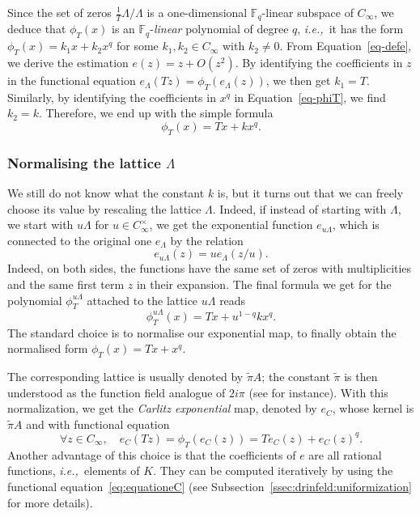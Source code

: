 \documentclass[11pt]{article}
\theoremstyle{definition}
\renewcommand{\tilde}{\widetilde}
\newcommand\Fq{\mathbb{F}_q}
\newcommand{\Cinf}{C_{\infty}}
\newcommand{\ie}{\textit{i.e.,~}}
\begin{document}
Since the set of zeros $\frac{1}{T} \Lambda / \Lambda$ is a 
one-dimensional $\Fq$-linear subspace of $\Cinf$, we deduce that
$\phi_T(x)$ is an $\Fq$-\emph{linear} polynomial of degree $q$, 
\ie it has the form $\phi_T(x) = k_1 x + k_2 x^q$
for some $k_1, k_2 \in \Cinf$ with $k_2\neq 0$. 
From Equation~\eqref{eq-defe}, we derive the estimation $e(z) 
= z + O(z^2)$. By identifying the coefficients in $z$ in the functional 
equation $e_\Lambda(Tz) = \phi_T(e_\Lambda(z))$, we then get $k_1 = T$.
Similarly, by identifying the coefficients in $x^q$ in Equation~\eqref{eq-phiT},
we find $k_2 = k$. Therefore, we end up with the simple formula
\[\phi_T(x)=T x + k x^q.\]

\subsubsection{Normalising the lattice \texorpdfstring{$\Lambda$}{Lambda}}

We still do not know what the constant $k$ is, but it turns out that we can freely choose its value by rescaling the lattice $\Lambda$. Indeed, if instead of starting with $\Lambda$, we start with $u\Lambda$ for $u\in\Cinf^\times$, we get the exponential function $e_{u\Lambda}$, which is connected to the original one
$e_{\Lambda}$ by the relation \[e_{u\Lambda}(z) = u e_\Lambda (z/u).\] 
Indeed, on both sides, the functions have the same set of zeros with multiplicities
and the same first term $z$ in their expansion. The final formula we get for the polynomial
$\phi_T^{u\Lambda}$ attached to the lattice $u\Lambda$ reads
\[\phi_T^{u\Lambda}(x)=T x + u^{1-q} k x^q.\]
The standard choice is to normalise our exponential map, to finally obtain the normalised form $\phi_T(x)=T x + x^q$.

The corresponding lattice is usually denoted by $\tilde\pi A$; the constant $\tilde\pi$ is then understood as the function field analogue of $2i\pi$ (see \cite[p.~317]{Pap23} for instance). 
With this normalization, we get the \emph{Carlitz exponential} map, denoted by $e_C$, whose kernel is $\tilde{\pi} A$ and with functional equation 
\begin{equation}
\label{eq:equationeC}
\forall z \in \Cinf, \quad
  e_C(Tz) = \phi_T(e_C(z)) = Te_C(z) + e_C(z)^q.
\end{equation}
Another advantage of this choice is that the coefficients of $e$ are all rational functions, \ie elements of $K$.
They can be computed iteratively by using the functional equation~\eqref{eq:equationeC} (see Subsection~\ref{ssec:drinfeld:uniformization} for more details).
\end{document}
